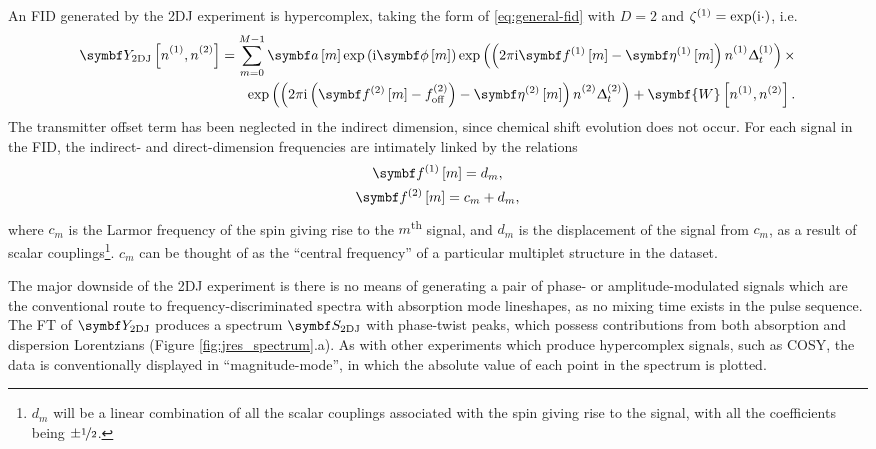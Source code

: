 An FID generated by the \ac{2DJ} experiment is hypercomplex, taking the form of
\eqref{eq:general-fid} with $D=2$ and $\zeta^{(1)} = \exp(\mathrm{i}\cdot)$, i.e.
\begin{equation}%
    \begin{split}%
        \jresfid\idxnonentwo =
        \sum_{m=0}^{M-1} \bdam \exp\left( \iu \bdphim \right)
            \exp\left(\left(2 \pi \iu \bdfonem
            - \bdetaonem\right) {\none}_{\vphantom{t}} \Dtone\right) \times \\
            \exp\left(\left(2 \pi \iu  \left(
            \bdftwom - \fofftwo \right)
            - \bdetatwom\right) {\ntwo}_{\vphantom{t}} \Dttwo\right)
            + \symbf{W}\left[n^{(1)}, n^{(2)}\right].
    \end{split}%
    \label{eq:jres-fid}
\end{equation}%
The transmitter offset term has been neglected in the indirect dimension, since
chemical shift evolution does not occur.
For each signal in the \ac{FID}, the indirect- and direct-dimension
frequencies are intimately linked by the relations
\begin{subequations}
    \begin{gather}
        \bdfonem = d_m,\\
        \bdftwom = c_m + d_m,
    \end{gather}
    \label{eq:f1-f2-2dj}
\end{subequations}
where $c_m$ is the Larmor frequency of the spin giving rise to the $m$\textsuperscript{th} signal, and $d_m$ is the displacement of the signal from $c_m$, as a result of scalar couplings\footnote{
    $d_m$ will be a linear combination of all the scalar couplings associated
    with the spin giving rise to the signal, with all the coefficients being
    $\pm \nicefrac{1}{2}$.
}.
$c_m$ can be thought of as the ``central frequency'' of a particular multiplet structure in the dataset.

The major downside of the \ac{2DJ}
experiment is there is no means of generating a pair of phase- or
amplitude-modulated signals which are the conventional route to
frequency-discriminated spectra with absorption mode lineshapes, as no mixing
time exists in the pulse sequence. The FT of $\jresfid$ produces a spectrum
$\jresspec$ with phase-twist peaks,
which possess contributions from both absorption and dispersion Lorentzians (Figure \ref{fig:jres_spectrum}.a).
As with other experiments which produce hypercomplex signals, such as
\ac{COSY}, the data is conventionally displayed in ``magnitude-mode'', in which
the absolute value of each point in the spectrum is plotted.

